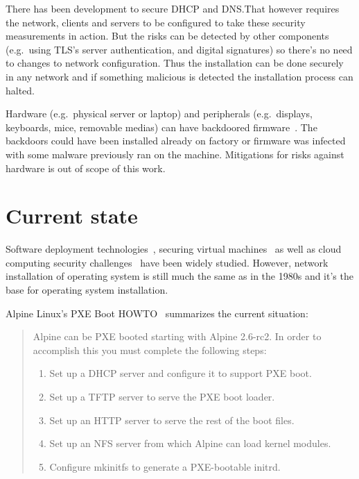 There has been development to secure DHCP and DNS.\@ That however
requires the network, clients and servers to be configured to take
these security measurements in action. But the risks can be detected
by other components (e.g.\ using TLS's server authentication, and
digital signatures) so there's no need to changes to network
configuration. Thus the installation can be done securely in any
network and if something malicious is detected the installation
process can halted.


Hardware (e.g.\ physical server or laptop) and peripherals (e.g.\
displays, keyboards, mice, removable medias) can have backdoored
firmware~\cite{swierczynski2016interdiction}. The backdoors could have
been installed already on factory or firmware was infected with some
malware previously ran on the machine. Mitigations for risks against
hardware is out of scope of this work.


\section{Current state}

Software deployment technologies~\cite{SoftDep}, securing virtual
machines~\cite{Garfinkel2005} as well as cloud computing security
challenges~\cite{Owens2010}\cite{Hashizume2013} have been widely
studied. However, network installation of operating system is still
much the same as in the 1980s and it's the base for operating system installation.

Alpine Linux's PXE Boot HOWTO~\cite{alpine-pxe-boot-howto} summarizes
the current situation:

\begin{quote}
Alpine can be PXE booted starting with Alpine 2.6-rc2. In order to
accomplish this you must complete the following steps:

\begin{enumerate}
\item Set up a DHCP server and configure it to support PXE boot.
\item Set up a TFTP server to serve the PXE boot loader.
\item Set up an HTTP server to serve the rest of the boot files.
\item Set up an NFS server from which Alpine can load kernel modules.
\item Configure mkinitfs to generate a PXE-bootable initrd.
\end{enumerate}
\end{quote}

